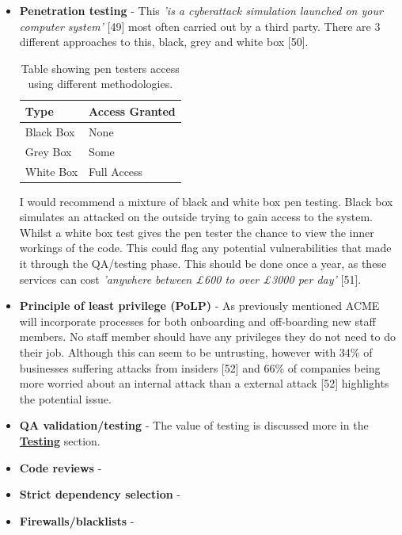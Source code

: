  \begin{itemize}
    \item \textbf{Penetration testing} - This \textit{'is a cyberattack simulation launched on your computer system'} [49] most often carried out by a
    third party. There are 3 different approaches to this, black, grey and white box [50].

    \begin{table}[H]
      \centering
      \begin{tabular}{|l|l|}
        \hline
        \textbf{Type} & \textbf{Access Granted}   \\ \hline
        Black Box     & None                      \\ \hline
        Grey Box      & Some                      \\ \hline
        White Box     & Full Access               \\ \hline
      \end{tabular}
      \caption{Table showing pen testers access using different methodologies.}
    \end{table}

    I would recommend a mixture of black and white box pen testing. Black box simulates an attacked on the outside trying to gain access to the system.
    Whilst a white box test gives the pen tester the chance to view the inner workings of the code. This could flag any potential vulnerabilities that 
    made it through the QA/testing phase. This should be done once a year, as these services can cost 
    \textit{'anywhere between £600 to over £3000 per day'} [51].

    \item \textbf{Principle of least privilege (PoLP)} - As previously mentioned ACME will incorporate processes for both onboarding and off-boarding 
    new staff members. No staff member should have any privileges they do not need to do their job. Although this can seem to be untrusting, however 
    with 34\% of businesses suffering attacks from insiders [52] and 66\% of companies being more worried about an internal attack than a external 
    attack [52] highlights the potential issue.

    \item \textbf{QA validation/testing} - The value of testing is discussed more in the \hyperref[sec:Testing]{\textbf{Testing}} section.
    
    \item \textbf{Code reviews} - 
    \item \textbf{Strict dependency selection} -
    \item \textbf{Firewalls/blacklists} - 
  \end{itemize}

\newpage
